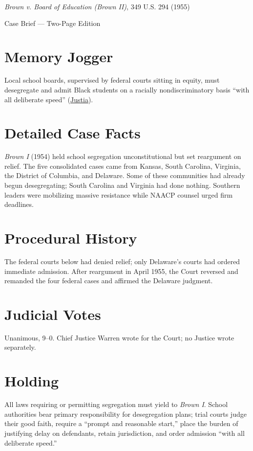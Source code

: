 \documentclass[12pt]{article}
\begin{document}
\begin{center}
{\LARGE \textit{Brown v. Board of Education (Brown II)}, 349 U.S. 294 (1955)\par}
\vspace{0.5em}
{\large Case Brief --- Two-Page Edition\par}
\end{center}

\section{Memory Jogger}
Local school boards, supervised by federal courts sitting in equity, must desegregate and admit Black students on a racially nondiscriminatory basis ``with all deliberate speed'' (\href{https://supreme.justia.com/cases/federal/us/349/294/}{Justia}).

\section{Detailed Case Facts}
\textit{Brown I} (1954) held school segregation unconstitutional but set reargument on relief. The five consolidated cases came from Kansas, South Carolina, Virginia, the District of Columbia, and Delaware. Some of these communities had already begun desegregating; South Carolina and Virginia had done nothing. Southern leaders were mobilizing massive resistance while NAACP counsel urged firm deadlines.

\section{Procedural History}
The federal courts below had denied relief; only Delaware's courts had ordered immediate admission. After reargument in April 1955, the Court reversed and remanded the four federal cases and affirmed the Delaware judgment.

\section{Judicial Votes}
Unanimous, 9--0. Chief Justice Warren wrote for the Court; no Justice wrote separately.

\section{Holding}
All laws requiring or permitting segregation must yield to \textit{Brown I}. School authorities bear primary responsibility for desegregation plans; trial courts judge their good faith, require a ``prompt and reasonable start,'' place the burden of justifying delay on defendants, retain jurisdiction, and order admission ``with all deliberate speed.''
\end{document}
